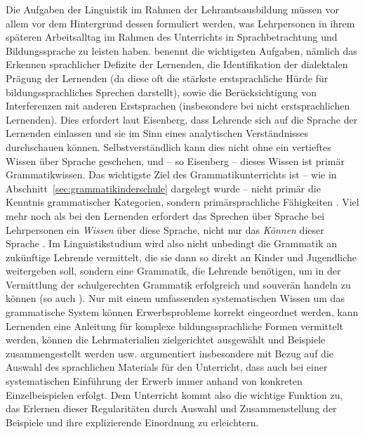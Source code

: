 Die Aufgaben der Linguistik im Rahmen der Lehramtsausbildung müssen vor allem vor dem Hintergrund dessen formuliert werden, was Lehrpersonen in ihrem späteren Arbeitsalltag im Rahmen des Unterrichts in Sprachbetrachtung und Bildungssprache zu leisten haben.
\citet[7]{Eisenberg2013c} benennt die wichtigsten Aufgaben, nämlich das Erkennen sprachlicher Defizite der Lernenden, die Identifikation der dialektalen Prägung der Lernenden (da diese oft die stärkste erstsprachliche Hürde für bildungssprachliches Sprechen darstellt), sowie die Berücksichtigung von Interferenzen mit anderen Erstsprachen (insbesondere bei nicht erstsprachlichen Lernenden).
Dies erfordert laut Eisenberg, dass Lehrende sich auf die Sprache der Lernenden einlassen und sie im Sinn eines analytischen Verständnisses durchschauen können.
Selbstverständlich kann dies nicht ohne ein vertieftes Wissen über Sprache geschehen, und -- so Eisenberg -- dieses Wissen ist primär Grammatikwissen.
Das wichtigste Ziel des Grammatikunterrichts ist -- wie in Abschnitt~\ref{sec:grammatikinderschule} dargelegt wurde -- nicht primär die Kenntnis grammatischer Kategorien, sondern primärsprachliche Fähigkeiten \citep[77]{Bredel2013}.
Viel mehr noch als bei den Lernenden erfordert das Sprechen über Sprache bei Lehrpersonen ein \textit{Wissen} über diese Sprache, nicht nur das \textit{Können} dieser Sprache \citep[94]{Bredel2013}.
Im Linguistikstudium wird also nicht unbedingt die Grammatik an zukünftige Lehrende vermittelt, die sie dann so direkt an Kinder und Jugendliche weitergeben soll, sondern eine Grammatik, die Lehrende benötigen, um in der Vermittlung der schulgerechten Grammatik erfolgreich und souverän handeln zu können (so auch \citealt[19]{Eisenberg2004}).
Nur mit einem umfassenden systematischen Wissen um das grammatische System können Erwerbsprobleme korrekt eingeordnet werden, kann Lernenden eine Anleitung für komplexe bildungssprachliche Formen vermittelt werden, können die Lehrmaterialien zielgerichtet ausgewählt und Beispiele zusammengestellt werden usw.
\citet[81--83]{Portmanntselikas2011} argumentiert insbesondere mit Bezug auf die Auswahl des sprachlichen Materials für den Unterricht, dass auch bei einer systematischen Einführung der Erwerb immer anhand von konkreten Einzelbeispielen erfolgt.
Dem Unterricht kommt also die wichtige Funktion zu, das Erlernen dieser Regularitäten durch Auswahl und Zusammenstellung der Beispiele und ihre explizierende Einordnung zu erleichtern.

